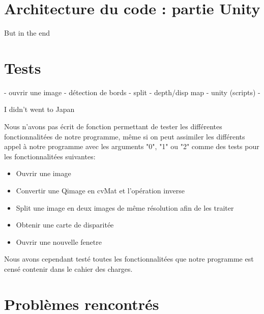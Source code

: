 \documentclass[a4paper]{article}
\begin{document}

\section{Architecture du code : partie Unity}

But in the end


\section{Tests}

- ouvrir une image
- détection de bords
- split
- depth/disp map
- unity (scripts)
-

I didn't went to Japan

Nous n'avons pas écrit de fonction permettant de tester les différentes fonctionnalitées de notre programme, même si on peut assimiler les différents appel à notre programme avec les arguments "0", "1" ou "2" comme des tests pour les fonctionnalitées suivantes:
\begin{itemize}
\item Ouvrir une image
\item Convertir une Qimage en cvMat et l'opération inverse
\item Split une image en deux images de même résolution afin de les traiter
\item Obtenir une carte de disparitée
\item Ouvrir une nouvelle fenetre

\end{itemize}


Nous avons cependant testé toutes les fonctionnalitées que notre programme est censé contenir dans le cahier des charges.


\section{Problèmes rencontrés}
\end{document}
